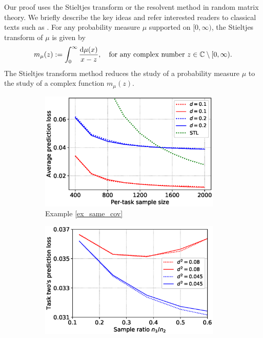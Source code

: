 Our proof uses the Stieltjes transform or the resolvent method in random matrix theory.
We briefly describe the key ideas and refer interested readers to classical texts such as  \citet{bai2009spectral,tao2012topics,erdos2017dynamical}.
For any probability measure $\mu$ supported on $[0,\infty)$, the Stieltjes transform of $\mu$ is given by
$$m_\mu(z):= \int_0^\infty \frac{\mathrm{d}\mu(x)}{x-z}, \ \ \text{ for any complex number } z\in \mathbb{C}\setminus [0,\infty).$$
The Stieltjes transform method reduces the study of a probability measure $\mu$ to the study of a complex function $m_\mu(z)$.



\begin{figure}[!t]
	\begin{subfigure}[b]{0.33\textwidth}
		\centering
		\includegraphics[width=0.95\textwidth]{figures/same_covariates.eps}
		\caption{Example \ref{ex_same_cov}}
		\label{fig_same_cov}
	\end{subfigure}\hfill
	\begin{subfigure}[b]{0.33\textwidth}
		\centering
		\includegraphics[width=0.95\textwidth]{figures/sample_ratio_several_d.eps}

\end{subfigure}
\end{figure}
